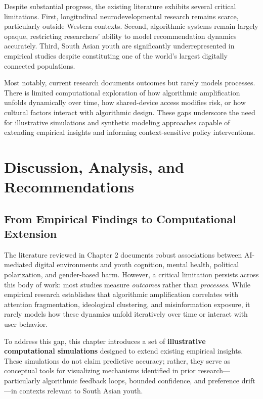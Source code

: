 \documentclass[12pt,a4paper]{report}
\begin{document}
Despite substantial progress, the existing literature exhibits several critical limitations. First, longitudinal neurodevelopmental research remains scarce, particularly outside Western contexts. Second, algorithmic systems remain largely opaque, restricting researchers’ ability to model recommendation dynamics accurately. Third, South Asian youth are significantly underrepresented in empirical studies despite constituting one of the world’s largest digitally connected populations.

Most notably, current research documents outcomes but rarely models processes. There is limited computational exploration of how algorithmic amplification unfolds dynamically over time, how shared-device access modifies risk, or how cultural factors interact with algorithmic design. These gaps underscore the need for illustrative simulations and synthetic modeling approaches capable of extending empirical insights and informing context-sensitive policy interventions.

\chapter{Discussion, Analysis, and Recommendations}

\section{From Empirical Findings to Computational Extension}

The literature reviewed in Chapter 2 documents robust associations between AI-mediated digital environments and youth cognition, mental health, political polarization, and gender-based harm. However, a critical limitation persists across this body of work: most studies measure \emph{outcomes} rather than \emph{processes}. While empirical research establishes that algorithmic amplification correlates with attention fragmentation, ideological clustering, and misinformation exposure, it rarely models how these dynamics unfold iteratively over time or interact with user behavior.

To address this gap, this chapter introduces a set of \textbf{illustrative computational simulations} designed to extend existing empirical insights. These simulations do not claim predictive accuracy; rather, they serve as conceptual tools for visualizing mechanisms identified in prior research—particularly algorithmic feedback loops, bounded confidence, and preference drift—in contexts relevant to South Asian youth.
\end{document}
